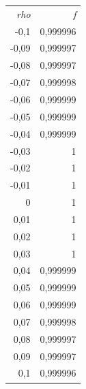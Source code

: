 	
\begin{tabular}{rr}

       \textit{rho} &          \textit{f} \\

      -0,1 &   0,999996 \\

     -0,09 &   0,999997 \\

     -0,08 &   0,999997 \\

     -0,07 &   0,999998 \\

     -0,06 &   0,999999 \\

     -0,05 &   0,999999 \\

     -0,04 &   0,999999 \\

     -0,03 &          1 \\

     -0,02 &          1 \\

     -0,01 &          1 \\

         0 &          1 \\

      0,01 &          1 \\

      0,02 &          1 \\

      0,03 &          1 \\

      0,04 &   0,999999 \\

      0,05 &   0,999999 \\

      0,06 &   0,999999 \\

      0,07 &   0,999998 \\

      0,08 &   0,999997 \\

      0,09 &   0,999997 \\

       0,1 &   0,999996 \\

\end{tabular}  
		
